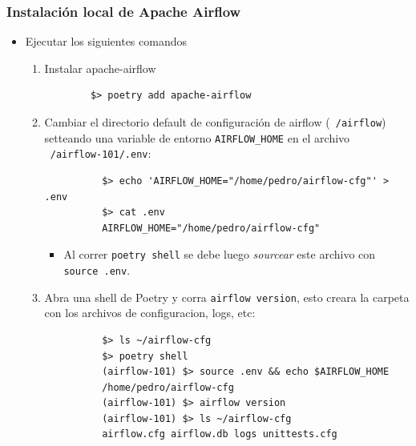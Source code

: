 \documentclass[leqno, 10pt, envcountsect]{beamer}
\numberwithin{equation}{section}
\theoremstyle{definition}
\theoremstyle{example}
\numberwithin{figure}{section}
\numberwithin{table}{section}
\let\olditem\item
\renewcommand{\item}{%
\olditem\vspace{1pt}}
\begin{document}
\begin{frame}[fragile=singleslide]
  \frametitle{Instalación local de Apache Airflow}
  \begin{itemize}
    \item Ejecutar los siguientes comandos
      \begin{enumerate}
        \item Instalar apache-airflow
        \begin{verbatim}
        $> poetry add apache-airflow
        \end{verbatim}
        \item Cambiar el directorio default de configuración de airflow
          (\texttt{~/airflow}) setteando una variable de entorno
          \texttt{AIRFLOW_HOME} en el archivo \texttt{~/airflow-101/.env}:
          \begin{verbatim}
          $> echo 'AIRFLOW_HOME="/home/pedro/airflow-cfg"' > .env
          $> cat .env
          AIRFLOW_HOME="/home/pedro/airflow-cfg"
          \end{verbatim}
          \begin{itemize}
            \item Al correr \texttt{poetry shell} se debe luego
              \textit{sourcear} este archivo con \texttt{source .env}.
          \end{itemize}
        \item Abra una shell de Poetry y corra \texttt{airflow version}, esto
          creara la carpeta con los archivos de configuracion, logs, etc:
          \begin{verbatim}
          $> ls ~/airflow-cfg
          $> poetry shell
          (airflow-101) $> source .env && echo $AIRFLOW_HOME
          /home/pedro/airflow-cfg
          (airflow-101) $> airflow version
          (airflow-101) $> ls ~/airflow-cfg
          airflow.cfg airflow.db logs unittests.cfg
          \end{verbatim}
      \end{enumerate}
  \end{itemize}
\end{frame}
\end{document}
